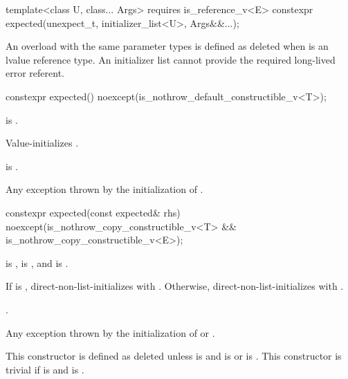 %
\begin{itemdecl}
template<class U, class... Args>
  requires is_reference_v<E>
constexpr expected(unexpect_t, initializer_list<U>, Args&&...);
\end{itemdecl}

\begin{itemdescr}
\pnum
\remarks
An overload with the same parameter types is defined as deleted when  is an lvalue reference type. An initializer list cannot provide the required long-lived error referent.
\end{itemdescr}

%
\begin{itemdecl}
constexpr expected() noexcept(is_nothrow_default_constructible_v<T>);
\end{itemdecl}

\begin{itemdescr}
\pnum
\constraints
{} is .

\pnum
\effects
Value-initializes .

\pnum
\ensures
{} is .

\pnum
\throws
Any exception thrown by the initialization of .
\end{itemdescr}

%
\begin{itemdecl}
constexpr expected(const expected& rhs) noexcept(is_nothrow_copy_constructible_v<T> &&
                                                 is_nothrow_copy_constructible_v<E>);
\end{itemdecl}

\begin{itemdescr}
\pnum
\constraints
{} is ,  is , and  is .

\pnum
\effects
If  is , direct-non-list-initializes  with . Otherwise, direct-non-list-initializes  with .

\pnum
\ensures
{}.

\pnum
\throws
Any exception thrown by the initialization of  or .

\pnum
\remarks
This constructor is defined as deleted unless  is  and  is  or  is . This constructor is trivial if  is  and  is .
\end{itemdescr}

